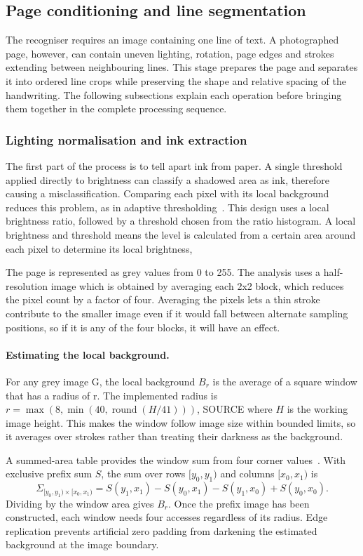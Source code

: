 \subsection{Page conditioning and line segmentation}
\label{sec:des-seg}
The recogniser requires an image containing one line of text. A photographed page, however, can contain uneven lighting, rotation, page edges and strokes extending between neighbouring lines. This stage prepares the page and separates it into ordered line crops while preserving the shape and relative spacing of the handwriting. The following subsections explain each operation before bringing them together in the complete processing sequence.

\subsubsection{Lighting normalisation and ink extraction}
The first part of the process is to tell apart ink from paper. A single threshold applied directly to brightness can classify a shadowed area as ink, therefore causing a misclassification. Comparing each pixel with its local background reduces this problem, as in adaptive thresholding~\cite[pp.~2--3]{bradley2007}. This design uses a local brightness ratio, followed by a threshold chosen from the ratio histogram. A local brightness and threshold means the level is calculated from a certain area around each pixel to determine its local brightness,

The page is represented as grey values from 0 to 255. The analysis uses a half-resolution image which is obtained by averaging each 2x2 block, which reduces the pixel count by a factor of four. Averaging the pixels lets a thin stroke contribute to the smaller image even if it would fall between alternate sampling positions, so if it is any of the four blocks, it will have an effect.

\paragraph{Estimating the local background.}
For any grey image G, the local background $B_r$ is the average of a square window that has a radius of r. The implemented radius is $r=\max(8,\min(40,\operatorname{round}(H/41)))$, SOURCE where $H$ is the working image height. This makes the window follow image size within bounded limits, so it averages over strokes rather than treating their darkness as the background.

A summed-area table provides the window sum from four corner values~\cite[p.~2]{bradley2007}. With exclusive prefix sum $S$, the sum over rows $[y_0,y_1)$ and columns $[x_0,x_1)$ is
\begin{equation}
\Sigma_{[y_0,y_1)\times[x_0,x_1)}=
S(y_1,x_1)-S(y_0,x_1)-S(y_1,x_0)+S(y_0,x_0).
\label{eq:des-integral}
\end{equation}
Dividing by the window area gives $B_r$. Once the prefix image has been constructed, each window needs four accesses regardless of its radius. Edge replication prevents artificial zero padding from darkening the estimated background at the image boundary.

